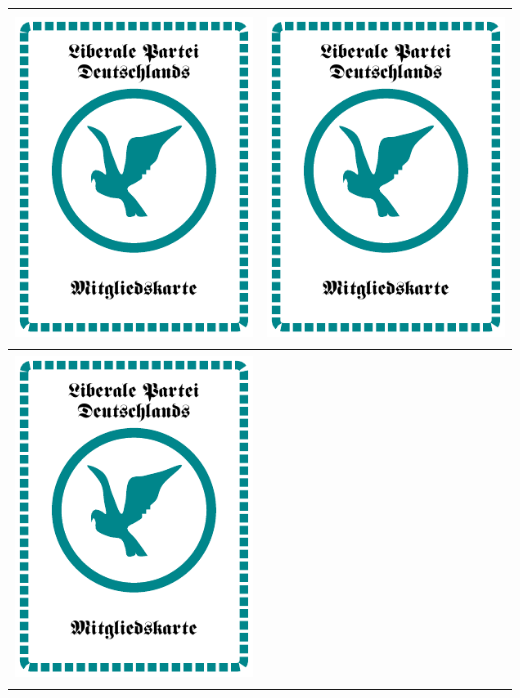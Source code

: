 \documentclass[12pt,a4paper,spanish]{article}
\begin{document}
	\begin{table}
		\centering
		\begin{tabular}{|c|c|}
			\toprule
			\includegraphics[height=8.7cm, angle=90]{./Drawings/party_liberal.pdf} &
			\includegraphics[height=8.7cm, angle=90]{./Drawings/party_liberal.pdf} \\
			\midrule
			\includegraphics[height=8.7cm, angle=90]{./Drawings/party_liberal.pdf} &

\end{tabular}
\end{table}
\end{document}
